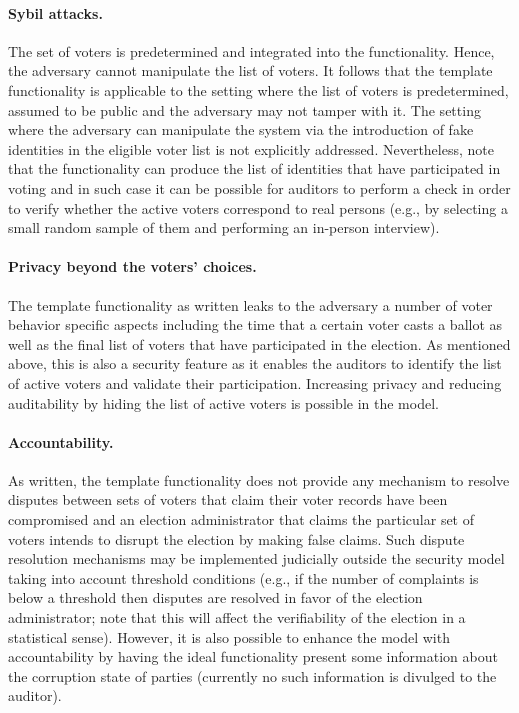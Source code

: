 \paragraph{Sybil attacks.} The set of voters is predetermined and
integrated into the functionality. Hence, the adversary cannot
manipulate the list of voters. It follows that the template
functionality is applicable to the setting where the list of voters is
predetermined, assumed to be public and the adversary may not tamper
with it. The setting where the adversary can manipulate the system via
the introduction of fake identities in the eligible voter list is not
explicitly addressed. Nevertheless, note that the functionality can
produce the list of identities that have participated in voting and in
such case it can be possible for auditors to perform a check in order
to verify whether the active voters correspond to real persons (e.g.,
by selecting a small random sample of them and performing an in-person
interview).

\paragraph{Privacy beyond the voters' choices.} The template
functionality as written leaks to the adversary a number of voter
behavior specific aspects including the time that a certain voter
casts a ballot as well as the final list of voters that have
participated in the election. As mentioned above, this is also a
security feature as it enables the auditors to identify the list of
active voters and validate their participation. Increasing privacy and
reducing auditability by hiding the list of active voters is possible
in the model.

\paragraph{Accountability.} As written, the template functionality
does not provide any mechanism to resolve disputes between sets of
voters that claim their voter records have been compromised and an
election administrator that claims the particular set of voters
intends to disrupt the election by making false claims. Such dispute
resolution mechanisms may be implemented judicially outside the
security model taking into account threshold conditions (e.g., if the
number of complaints is below a threshold then disputes are resolved
in favor of the election administrator; note that this will affect the
verifiability of the election in a statistical sense). However, it is
also possible to enhance the model with accountability by having the
ideal functionality present some information about the corruption
state of parties (currently no such information is divulged to the
auditor).


